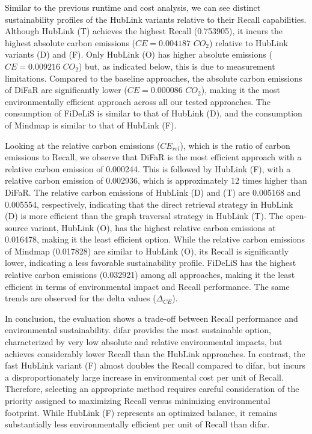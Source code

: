 Similar to the previous runtime and cost analysis, we can see distinct sustainability profiles of the HubLink variants relative to their Recall capabilities. Although HubLink (T) achieves the highest Recall (0.753905), it incurs the highest absolute carbon emissions ($CE = 0.004187$ $CO_2$) relative to HubLink variants (D) and (F). Only HubLink (O) has higher absolute emissions ($CE = 0.009216$ $CO_2$) but, as indicated below, this is due to measurement limitations. Compared to the baseline approaches, the absolute carbon emissions of DiFaR are significantly lower ($CE = 0.000086$ $CO_2$), making it the most environmentally efficient approach across all our tested approaches. The consumption of FiDeLiS is similar to that of HubLink (D), and the consumption of Mindmap is similar to that of HubLink (F).

Looking at the relative carbon emissions ($CE_{rel}$), which is the ratio of carbon emissions to Recall, we observe that DiFaR is the most efficient approach with a relative carbon emission of 0.000244. This is followed by HubLink (F), with a relative carbon emission of 0.002936, which is approximately 12 times higher than DiFaR. The relative carbon emissions of HubLink (D) and (T) are 0.005168 and 0.005554, respectively, indicating that the direct retrieval strategy in HubLink (D) is more efficient than the graph traversal strategy in HubLink (T). The open-source variant, HubLink (O), has the highest relative carbon emissions at 0.016478, making it the least efficient option. While the relative carbon emissions of Mindmap (0.017828) are similar to HubLink (O), its Recall is significantly lower, indicating a less favorable sustainability profile. FiDeLiS has the highest relative carbon emissions (0.032921) among all approaches, making it the least efficient in terms of environmental impact and Recall performance. The same trends are observed for the delta values ($\Delta_{CE}$).

In conclusion, the evaluation shows a trade-off between Recall performance and environmental sustainability. \gls{difar} provides the most sustainable option, characterized by very low absolute and relative environmental impacts, but achieves considerably lower Recall than the HubLink approaches. In contrast, the fast HubLink variant (F) almost doubles the Recall compared to \gls{difar}, but incurs a disproportionately large increase in environmental cost per unit of Recall. Therefore, selecting an appropriate method requires careful consideration of the priority assigned to maximizing Recall versus minimizing environmental footprint. While HubLink (F) represents an optimized balance, it remains substantially less environmentally efficient per unit of Recall than \gls{difar}.

